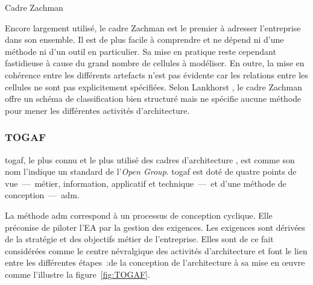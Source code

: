 %
%
%

\begin{table}[!ht]
    \vspace*{0.4cm}
    
    \caption{Cadre Zachman \protect\cite{zachman1987framework}}
    \label{fig:Zachman}
\end{table}


Encore largement utilisé, le cadre Zachman est le premier à adresser
l'entreprise dans son ensemble. Il est de plus facile à comprendre et ne dépend
ni d'une méthode ni d'un outil en particulier. Sa mise en pratique reste
cependant fastidieuse à cause du grand nombre de cellules à modéliser. En
outre, la mise en cohérence entre les différents artefacts n'est pas évidente
car les relations entre les cellules ne sont pas explicitement spécifiées.
Selon Lankhorst \cite{lankhorst2013enterprise}, le cadre Zachman offre un
schéma de classification bien structuré mais ne spécifie aucune méthode pour
mener les différentes activités d'architecture.

\subsubsection{TOGAF} 

\gls{togaf}, le plus connu et le plus utilisé des cadres d'architecture \cite{winter2008enterprise}, est comme son nom l'indique un standard de l'\textit{Open Group}. \gls{togaf} est doté de quatre points de vue~—~métier, information, applicatif et technique~—~et d'une méthode de conception~—~\gls{adm}. 

La méthode \gls{adm} correspond à un processus de conception cyclique. Elle préconise
de piloter l'EA par la gestion des exigences. Les exigences sont dérivées de la
stratégie et des objectifs métier de l'entreprise. Elles sont de ce fait
considérées comme le centre névralgique des activités d'architecture et font le
lien entre les différentes étapes~:de la conception de l'architecture à sa mise
en œuvre comme l'illustre la figure~\ref{fig:TOGAF}. 

